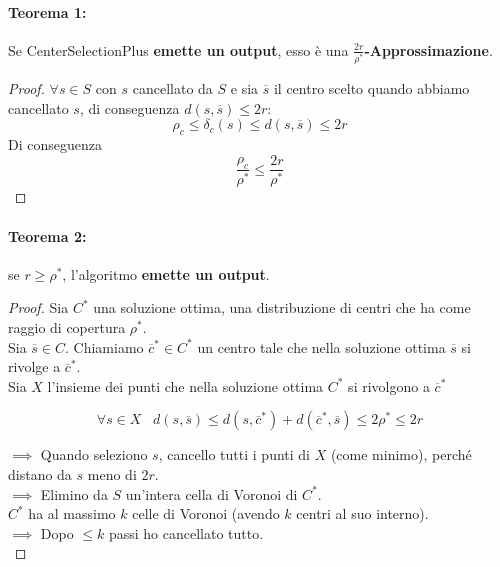 \newpage

\paragraph{Teorema 1:} Se CenterSelectionPlus \textbf{emette un output}, esso è una \textbf{$\frac{2r}{\rho^\ast}$-Approssimazione}.

\begin{proof}
	$\forall s \in S$ con $s$ cancellato da $S$ e sia $\overline{s}$ il centro scelto quando abbiamo cancellato $s$, di conseguenza $d(s, \overline{s}) \leq 2r$:
	$$\rho_c \leq \delta_c (s) \leq d(s, \overline{s}) \leq 2r $$
	Di conseguenza
	$$ \frac{\rho_c}{\rho^\ast} \leq \frac{2r}{\rho^\ast}$$
\end{proof}

\paragraph{Teorema 2:} se $r \geq \rho^\ast$, l'algoritmo \textbf{emette un output}.\\

\begin{proof}
	Sia $C^\ast$ una soluzione ottima, una distribuzione di centri che ha come raggio di copertura $\rho^\ast$.  \\
	Sia $\overline{s} \in C$. Chiamiamo $\overline{c}^\ast \in C^\ast$ un centro tale che nella soluzione ottima $\overline{s}$ si rivolge a $\overline{c}^\ast$.\\
	Sia $X$ l'insieme dei punti che nella soluzione ottima $C^\ast$ si rivolgono a $\overline{c}^\ast$
	
	$$ \forall s \in X \;\;\; d(s, \overline{s}) \leq d(s, \overline{c}^\ast) + d(\overline{c}^\ast, \overline{s}) \leq 2 \rho^\ast \leq 2r $$
	
	$\implies$ Quando seleziono $s$, cancello tutti i punti di $X$ (come minimo), perché distano da $s$ meno di $2r$.\\
	$\implies$ Elimino da $S$ un'intera cella di Voronoi di $C^\ast$.\\
	
	$C^\ast$ ha al massimo $k$ celle di Voronoi (avendo $k$ centri al suo interno).\\
	$\implies$ Dopo $\leq k$ passi ho cancellato tutto.\\
\end{proof}


